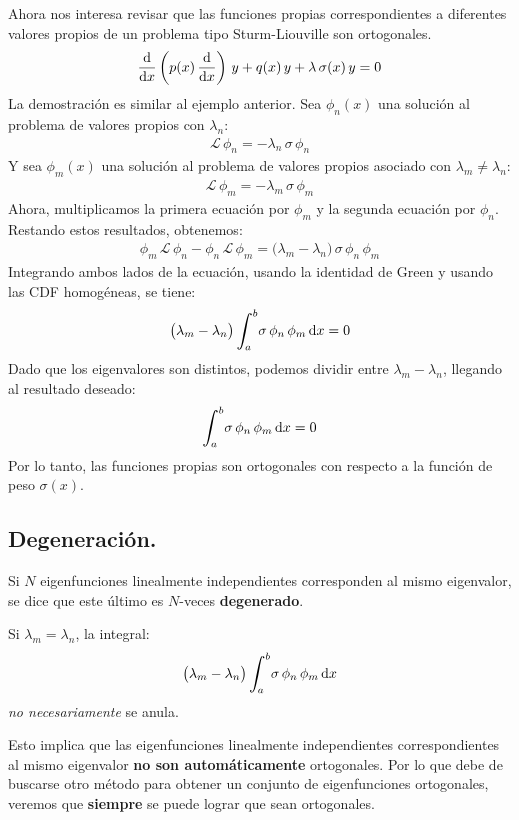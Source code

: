 \documentclass[12pt]{article}
\def\scaleint#1{\vcenter{\hbox{\scaleto[3ex]{\displaystyle\int}{#1}}}}
\def\bs{\mkern-12mu}
\numberwithin{equation}{section}
\begin{document}
Ahora nos interesa revisar que las funciones propias correspondientes a diferentes valores propios de un problema tipo Sturm-Liouville son ortogonales.
\begin{align*}
\dv{x} \left( p(x) \, \dv{x} \right) \, y + q(x) \, y + \lambda \, \sigma (x) \, y = 0
\end{align*}
La demostración es similar al ejemplo anterior. Sea $\phi_{n}(x)$ una solución al problema de valores propios con $\lambda_{n}$:
\begin{align*}
\mathcal{L} \, \phi_{n} = - \lambda_{n} \, \sigma \, \phi_{n}
\end{align*}
Y sea $\phi_{m}(x)$ una solución al problema de valores propios asociado con $\lambda_{m} \neq \lambda_{n}$:
\begin{align*}
\mathcal{L} \, \phi_{m} = - \lambda_{m} \, \sigma \, \phi_{m}
\end{align*}
Ahora, multiplicamos la primera ecuación por $\phi_{m}$ y la segunda ecuación por $\phi_{n}$. Restando estos resultados, obtenemos:
\begin{align*}
\phi_{m}\, \mathcal{L} \, \phi_{n} - \phi_{n} \, \mathcal{L} \, \phi_{m} = \big( \lambda_{m} - \lambda_{n} \big) \, \sigma \, \phi_{n} \, \phi_{m}
\end{align*}
Integrando ambos lados de la ecuación, usando la identidad de Green y usando las CDF homogéneas, se tiene:
\begin{align*}
\big( \lambda_{m} - \lambda_{n} \big) \, \scaleint{6ex}_{\bs a}^{b} \sigma \, \phi_{n} \, \phi_{m} \dd{x} = 0
\end{align*}
Dado que los eigenvalores son distintos, podemos dividir entre $\lambda_{m} - \lambda_{n}$, llegando al resultado deseado:
\begin{align*}
\scaleint{6ex}_{\bs a}^{b} \sigma \, \phi_{n} \, \phi_{m} \dd{x} = 0
\end{align*}
Por lo tanto, las funciones propias son ortogonales con respecto a la función de peso $\sigma(x)$.

\subsection{Degeneración.}

Si $N$ eigenfunciones linealmente independientes corresponden al mismo eigenvalor, se dice que este último es $N$-veces \textbf{degenerado}.
\par
Si $\lambda_{m} = \lambda_{n}$, la integral:
\begin{align*}
\big( \lambda_{m} - \lambda_{n} \big) \, \scaleint{6ex}_{\bs a}^{b} \sigma \, \phi_{n} \, \phi_{m} \dd{x}
\end{align*}
\emph{no necesariamente} se anula.
\par
Esto implica que las eigenfunciones linealmente independientes correspondientes al mismo eigenvalor \textbf{no son automáticamente} ortogonales. Por lo que debe de buscarse otro método para obtener un conjunto de eigenfunciones ortogonales,  veremos que \textbf{siempre} se puede lograr que sean ortogonales.
\end{document}
